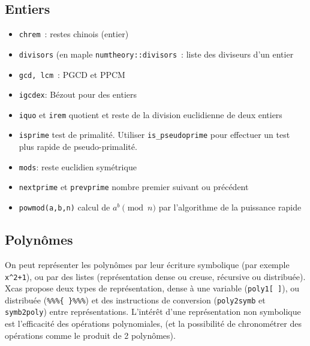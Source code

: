 \documentclass[a4paper,11pt]{book}
\begin{document}
\begin{giacjshere}
\subsection{Entiers}
\begin{itemize}
\item \verb|chrem|~:
restes chinois (entier)
\item \verb|divisors|
(en maple \verb|numtheory::divisors|~:
liste des diviseurs d'un entier
\item \verb|gcd, lcm|~: PGCD et PPCM
\item \verb|igcdex|: Bézout pour des entiers
\item \verb|iquo| et \verb|irem| quotient et reste de la division 
euclidienne de deux entiers
\item \verb|isprime| test de primalit\'e. 
Utiliser \verb|is_pseudoprime| pour effectuer un test plus rapide
de pseudo-primalit\'e.
\item \verb|mods|: reste euclidien symétrique
\item \verb|nextprime| et \verb|prevprime| 
nombre premier suivant ou pr\'ec\'edent
\item \verb|powmod(a,b,n)| %
calcul de $a^b \pmod n$ par
l'algorithme de la puissance rapide
\end{itemize}

\subsection{Polyn\^omes}
On peut repr\'esenter les polyn\^omes par leur \'ecriture symbolique
(par exemple \verb|x^2+1|), ou par des listes (repr\'esentation dense
ou creuse, r\'ecursive ou distribu\'ee). 
Xcas propose deux types
de repr\'esentation, dense \`a une variable (\verb|poly1[ ]|), ou
distribu\'ee (\verb|%%%{ }%%%|) et des instructions de conversion
(\verb|poly2symb| et \verb|symb2poly|) entre repr\'esentations.
L'int\'er\^et d'une repr\'esentation
non symbolique est l'efficacit\'e des op\'erations polynomiales, (et la
possibilit\'e de chronom\'etrer des op\'erations comme le produit
de 2 polyn\^omes).


\end{giacjshere}
\end{document}

